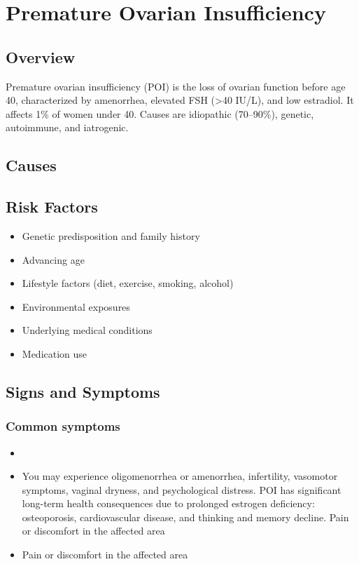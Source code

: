 \chapter{Premature Ovarian Insufficiency}
\label{sec:Premature Ovarian Insufficiency}

\section{Overview}
Premature ovarian insufficiency (POI) is the loss of ovarian function before age 40, characterized by amenorrhea, elevated FSH (>40 IU/L), and low estradiol. It affects 1\% of women under 40. Causes are idiopathic (70--90\%), genetic, autoimmune, and iatrogenic.
\section{Causes}
\section{Risk Factors}

\begin{itemize}[noitemsep]
  \item Genetic predisposition and family history
  \item Advancing age
  \item Lifestyle factors (diet, exercise, smoking, alcohol)
  \item Environmental exposures
  \item Underlying medical conditions
  \item Medication use
\end{itemize}
\section{Signs and Symptoms}

\subsection{Common symptoms}
\begin{itemize}[noitemsep]
  \item \item You may experience oligomenorrhea or amenorrhea, infertility, vasomotor symptoms, vaginal dryness, and psychological distress. POI has significant long-term health consequences due to prolonged estrogen deficiency: osteoporosis, cardiovascular disease, and thinking and memory decline. Pain or discomfort in the affected area    \item Pain or discomfort in the affected area
  \end{itemize}

